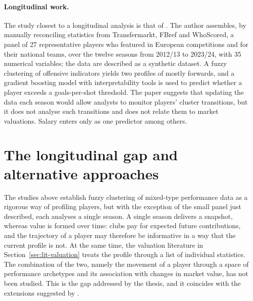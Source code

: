 \paragraph{Longitudinal work.} The study closest to a longitudinal analysis is that of . The author assembles, by manually reconciling statistics from Transfermarkt, FBref and WhoScored, a panel of 27 representative players who featured in European competitions and for their national teams, over the twelve seasons from 2012/13 to 2023/24, with 35 numerical variables; the data are described as a synthetic dataset. A fuzzy clustering of offensive indicators yields two profiles of mostly forwards, and a gradient boosting model with interpretability tools is used to predict whether a player exceeds a goals-per-shot threshold. The paper suggests that updating the data each season would allow analysts to monitor players' cluster transitions, but it does not analyse such transitions and does not relate them to market valuations. Salary enters only as one predictor among others.

\section{The longitudinal gap and alternative approaches}
\label{sec:lit-gap}

The studies above establish fuzzy clustering of mixed-type performance data as a rigorous way of profiling players, but with the exception of the small panel just described, each analyses a single season. A single season delivers a snapshot, whereas value is formed over time: clubs pay for expected future contributions, and the trajectory of a player may therefore be informative in a way that the current profile is not. At the same time, the valuation literature in Section~\ref{sec:lit-valuation} treats the profile through a list of individual statistics. The combination of the two, namely the movement of a player through a space of performance archetypes and its association with changes in market value, has not been studied. This is the gap addressed by the thesis, and it coincides with the extensions suggested by .

